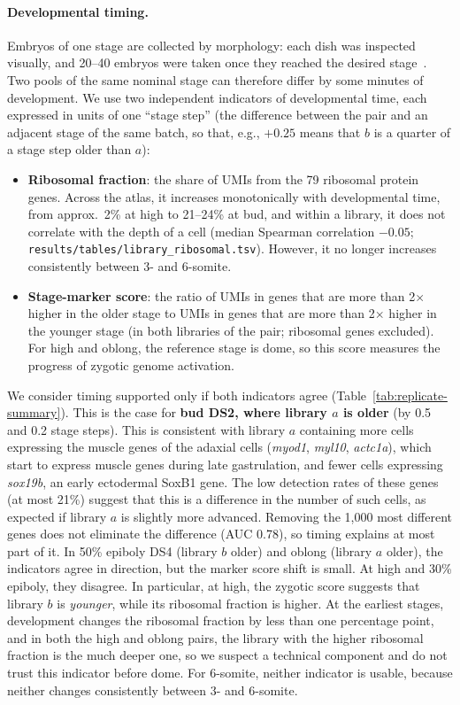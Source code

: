 \documentclass[11pt,a4paper]{article}
\begin{document}
\paragraph{Developmental timing.} Embryos of one stage are collected by morphology: each dish was inspected visually, and 20--40 embryos were taken once they reached the desired stage~\cite{farrell2018}. Two pools of the same nominal stage can therefore differ by some minutes of development. We use two independent indicators of developmental time, each expressed in units of one ``stage step'' (the difference between the pair and an adjacent stage of the same batch, so that, e.g., $+0.25$ means that $b$ is a quarter of a stage step older than $a$):
\begin{itemize}
	\item \textbf{Ribosomal fraction}: the share of UMIs from the 79 ribosomal protein genes. Across the atlas, it increases monotonically with developmental time, from approx.~2\% at high to 21--24\% at bud, and within a library, it does not correlate with the depth of a cell (median Spearman correlation $-0.05$; \nolinkurl{results/tables/library_ribosomal.tsv}). However, it no longer increases consistently between 3- and 6-somite.
	\item \textbf{Stage-marker score}: the ratio of UMIs in genes that are more than 2$\times$ higher in the older stage to UMIs in genes that are more than 2$\times$ higher in the younger stage (in both libraries of the pair; ribosomal genes excluded). For high and oblong, the reference stage is dome, so this score measures the progress of zygotic genome activation.
\end{itemize}
We consider timing supported only if both indicators agree (Table~\ref{tab:replicate-summary}). This is the case for \textbf{bud DS2, where library $a$ is older} (by 0.5 and 0.2 stage steps). This is consistent with library $a$ containing more cells expressing the muscle genes of the adaxial cells (\emph{myod1}, \emph{myl10}, \emph{actc1a}), which start to express muscle genes during late gastrulation, and fewer cells expressing \emph{sox19b}, an early ectodermal SoxB1 gene. The low detection rates of these genes (at most 21\%) suggest that this is a difference in the number of such cells, as expected if library $a$ is slightly more advanced. Removing the 1{,}000 most different genes does not eliminate the difference (AUC 0.78), so timing explains at most part of it. In 50\% epiboly DS4 (library $b$ older) and oblong (library $a$ older), the indicators agree in direction, but the marker score shift is small. At high and 30\% epiboly, they disagree. In particular, at high, the zygotic score suggests that library $b$ is \emph{younger}, while its ribosomal fraction is higher. At the earliest stages, development changes the ribosomal fraction by less than one percentage point, and in both the high and oblong pairs, the library with the higher ribosomal fraction is the much deeper one, so we suspect a technical component and do not trust this indicator before dome. For 6-somite, neither indicator is usable, because neither changes consistently between 3- and 6-somite.
\end{document}
